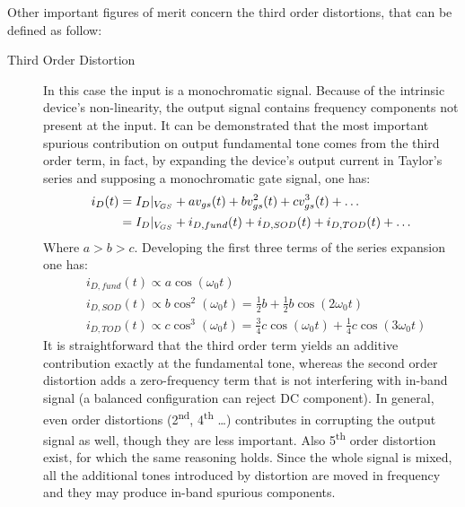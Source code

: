 Other important figures of merit concern the third order distortions, that can be defined as follow:
\begin{description}
	\item [Third Order Distortion] In this case the input is a monochromatic signal. Because of the intrinsic device's non-linearity, the output signal contains frequency components not present at the input. It can be demonstrated that the most important spurious contribution on output fundamental tone comes from the third order term, in fact, by expanding the device's output current in Taylor's series and supposing a monochromatic gate signal, one has:
	\begin{align}
		i_D(t) &= I_D|_{V_{GS}}+av_{gs}(t)+bv_{gs}^2(t)+cv_{gs}^3(t)+\dots \notag \\
		&=I_D|_{V_{GS}}+i_{D,fund}(t)+i_{D,SOD}(t)+	i_{D,TOD}(t)+\dots
	\end{align}
	Where $a>b>c$. Developing the first three terms of the series expansion one has:
	\begin{align}
	&i_{D,fund}(t) \propto a\cos(\omega_0 t) \\
	&i_{D,SOD}(t) \propto b\cos^2(\omega_0 t) =\frac{1}{2}b+\frac{1}{2}b\cos(2\omega_0 t) \\
	&i_{D,TOD}(t) \propto c\cos^3(\omega_0 t) = \frac{3}{4}c\cos(\omega_0 t) +\frac{1}{4}c\cos(3\omega_0 t)
	\end{align} 
	It is straightforward that the third order term yields an additive contribution exactly at the fundamental tone, whereas the second order distortion adds a zero-frequency term that is not interfering with in-band signal (a balanced configuration can reject DC component). In general, even order distortions (2\textsuperscript{nd}, 4\textsuperscript{th} \dots) contributes in corrupting the output signal as well, though they are less important. Also 5\textsuperscript{th} order distortion exist, for which the same reasoning holds. Since the whole signal is mixed, all the additional tones introduced by distortion are moved in frequency and they may produce in-band spurious components.
	

\end{description}
